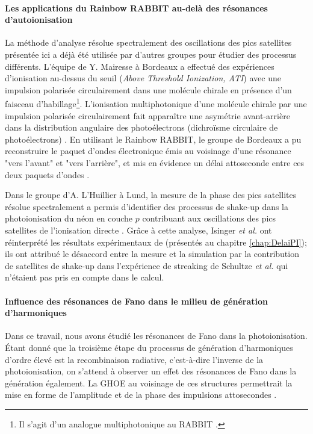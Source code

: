 \paragraph*{Les applications du Rainbow RABBIT au-delà des résonances d'autoionisation} La méthode d'analyse résolue spectralement des oscillations des pics satellites présentée ici a déjà été utilisée par d'autres groupes pour étudier des processus différents. L'équipe de Y. Mairesse à Bordeaux a effectué des expériences d'ionisation au-dessus du seuil (\textit{Above Threshold Ionization, ATI}) avec une impulsion polarisée circulairement dans une molécule chirale en présence d'un faisceau d'habillage\footnote{Il s'agit d'un analogue multiphotonique au RABBIT .}. L'ionisation multiphotonique d'une molécule chirale par une impulsion polarisée circulairement fait apparaître une asymétrie avant-arrière dans la distribution angulaire des photoélectrons (dichroïsme circulaire de photoélectrons) . En utilisant le Rainbow RABBIT, le groupe de Bordeaux a pu reconstruire le paquet d'ondes électronique émis au voisinage d'une résonance "vers l'avant" et "vers l'arrière", et mis en évidence un délai attoseconde entre ces deux paquets d'ondes .

Dans le groupe d'A. L'Huillier à Lund, la mesure de la phase des pics satellites résolue spectralement a permis d'identifier des processus de shake-up dans la photoionisation du néon en couche $p$ contribuant aux oscillations des pics satellites de l'ionisation directe . Grâce à cette analyse, Isinger \textit{et al.} ont réinterprété les résultats expérimentaux de  (présentés au chapitre \ref{chap:DelaiPI}); ils ont attribué le désaccord entre la mesure et la simulation par la contribution de satellites de shake-up dans l'expérience de streaking de Schultze \textit{et al.} qui n'étaient pas pris en compte dans le calcul.

\paragraph*{Influence des résonances de Fano dans le milieu de génération d'harmoniques} Dans ce travail, nous avons étudié les résonances de Fano dans la photoionisation. \'{E}tant donné que la troisième étape du processus de génération d'harmoniques d'ordre élevé est la recombinaison radiative, c'est-à-dire l'inverse de la photoionisation, on s'attend à observer un effet des résonances de Fano dans la génération également. La GHOE au voisinage de ces structures permettrait la mise en forme de l'amplitude et de la phase des impulsions attosecondes .

